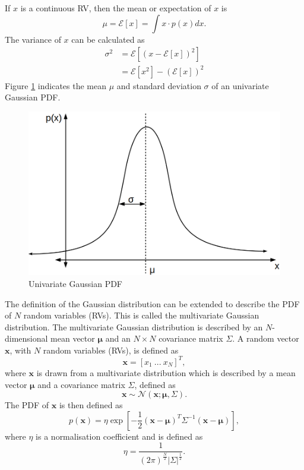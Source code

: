 \documentclass[12pt,oneside,openany,a4paper, %
afrikaans,english,
]{memoir}
\numberwithin{equation}{chapter}
\begin{document}
If $x$ is a continuous RV, then the mean or expectation of $x$ is
\begin{equation}
\mu = \mathcal{E}\left[ x \right] = \int x \cdot p(x)dx.
\end{equation}
The variance of $x$ can be calculated as
\begin{equation}
\begin{split}
\sigma^2 & = \mathcal{E}\left[\left(x - \mathcal{E}[x]\right)^2\right]\\
& = \mathcal{E}[x^2] - (\mathcal{E}[x])^2
\end{split}
\end{equation}
 Figure \ref{fig:gPDF1} indicates the mean $\mu$ and standard deviation $\sigma$ of an univariate Gaussian PDF.
\begin{figure}[H]
  \includegraphics[width=0.6\linewidth]{Figures/univariate.png}
  \centering
  \caption{Univariate Gaussian PDF}
  \label{fig:gPDF1}
\end{figure}
The definition of the Gaussian distribution can be extended to describe the PDF of $N$ random variables (RVs). This is called the multivariate Gaussian distribution. The multivariate Gaussian distribution is described by an $N$-dimensional mean vector $\bm{\mu}$ and an $N\times N$ covariance matrix $\Sigma$. A random vector $\bm{x}$, with $N$ random variables (RVs), is defined as
\begin{equation}
\bm{x} = [x_1\ ...\ x_N]^T,
\end{equation}
where $\bm{x}$ is drawn from a multivariate distribution which is described by a mean vector $\bm{\mu}$ and a covariance matrix $\Sigma$, defined as
\begin{equation}
\bm{x} \sim \mathcal{N}(\bm{x}; \bm{\mu},\Sigma).
\end{equation}
The PDF of $\bm{x}$ is then defined as
\begin{equation}\label{eq:3}
p(\bm{x})  = \eta\exp\left[-\frac{1}{2}(\bm{x}-\bm{\mu})^T\Sigma^{-1}(\bm{x}-\bm{\mu})\right],
\end{equation}
where $\eta$ is a normalisation coefficient and is defined as
\begin{equation}\label{eq:4}
\eta = \frac{1}{(2\pi)^{\frac{N}{2}}|\Sigma|^{\frac{1}{2}}}.
\end{equation}
\end{document}
